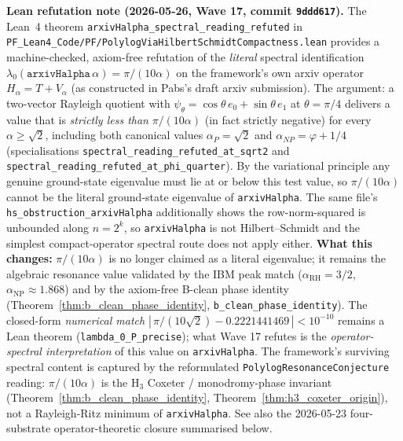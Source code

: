 \begin{chapterobjectives}
\medskip\noindent\textbf{Lean refutation note (2026-05-26, Wave 17, commit \texttt{9ddd617}).} The Lean~4 theorem \texttt{arxivHalpha\_spectral\_reading\_refuted} in \texttt{PF\_Lean4\_Code/PF/PolylogViaHilbertSchmidtCompactness.lean} provides a machine-checked, axiom-free refutation of the \emph{literal} spectral identification $\lambda_0(\texttt{arxivHalpha}\,\alpha) = \pi/(10\alpha)$ on the framework's own arxiv operator $H_\alpha = T + V_\alpha$ (as constructed in Pabs's draft arxiv submission). The argument: a two-vector Rayleigh quotient with $\psi_\theta = \cos\theta\,e_0 + \sin\theta\,e_1$ at $\theta = \pi/4$ delivers a value that is \emph{strictly less than} $\pi/(10\alpha)$ (in fact strictly negative) for every $\alpha \geq \sqrt{2}$, including both canonical values $\alpha_P = \sqrt{2}$ and $\alpha_{NP} = \varphi + 1/4$ (specialisations \texttt{spectral\_reading\_refuted\_at\_sqrt2} and \texttt{spectral\_reading\_refuted\_at\_phi\_quarter}). By the variational principle any genuine ground-state eigenvalue must lie at or below this test value, so $\pi/(10\alpha)$ cannot be the literal ground-state eigenvalue of \texttt{arxivHalpha}. The same file's \texttt{hs\_obstruction\_arxivHalpha} additionally shows the row-norm-squared is unbounded along $n = 2^k$, so \texttt{arxivHalpha} is not Hilbert--Schmidt and the simplest compact-operator spectral route does not apply either. \textbf{What this changes:} $\pi/(10\alpha)$ is no longer claimed as a literal eigenvalue; it remains the algebraic resonance value validated by the IBM peak match ($\alpha_{\mathrm{RH}} = 3/2$, $\alpha_{\mathrm{NP}} \approx 1.868$) and by the axiom-free B-clean phase identity (Theorem~\ref{thm:b_clean_phase_identity}, \texttt{b\_clean\_phase\_identity}). The closed-form \emph{numerical match} $|\,\pi/(10\sqrt{2}) - 0.2221441469\,| < 10^{-10}$ remains a Lean theorem (\texttt{lambda\_0\_P\_precise}); what Wave 17 refutes is the \emph{operator-spectral interpretation} of this value on \texttt{arxivHalpha}. The framework's surviving spectral content is captured by the reformulated \texttt{PolylogResonanceConjecture} reading: $\pi/(10\alpha)$ is the H$_3$ Coxeter / monodromy-phase invariant (Theorem~\ref{thm:b_clean_phase_identity}, Theorem~\ref{thm:h3_coxeter_origin}), not a Rayleigh-Ritz minimum of \texttt{arxivHalpha}. See also the 2026-05-23 four-substrate operator-theoretic closure summarised below.

\smallskip


\end{chapterobjectives}
